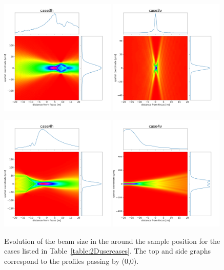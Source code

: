 \documentclass{iucr}              %
\begin{document}
\begin{figure}
\includegraphics[width=0.49\textwidth]{figures/case3h_caustic.png}
\includegraphics[width=0.49\textwidth]{figures/case3v_caustic.png}

\includegraphics[width=0.49\textwidth]{figures/case4h_caustic.png}
\includegraphics[width=0.49\textwidth]{figures/case4v_caustic.png}

\caption{Evolution of the beam size in the around the sample position for the cases listed in Table~\ref{table:2Dusercases}. The top and side graphs correspond to the profiles passing by (0,0).
}
\end{figure}
\end{document}
